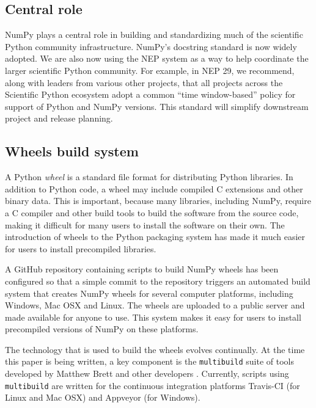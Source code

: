 \subsection*{Central role}

NumPy plays a central role in building and standardizing much of the scientific
Python community infrastructure.
NumPy's docstring standard is now widely adopted.
We are also now using the NEP system as a way to help coordinate the larger
scientific Python community.
For example, in NEP 29, we recommend, along with leaders from various other
projects, that all projects across the Scientific Python ecosystem adopt a
common ``time window-based'' policy for support of Python and NumPy versions.
This standard will simplify downstream project and release planning.

\subsection*{Wheels build system}

A Python \emph{wheel} \cite{PEP427} is a standard file format for
distributing Python libraries.  In addition to Python code, a
wheel may include compiled C extensions and other binary data.
This is important, because many libraries, including NumPy,
require a C compiler and other build tools to build the software
from the source code, making it difficult for many users to install
the software on their own.  The introduction of wheels to the Python
packaging system has made it much easier for users to install
precompiled libraries.

A GitHub repository containing scripts to build NumPy wheels has
been configured so that a simple commit to the repository triggers
an automated build system that creates NumPy wheels for several
computer platforms, including Windows, Mac OSX and Linux.  The wheels
are uploaded to a public server and made available for anyone to use.
This system makes it easy for users to install precompiled versions
of NumPy on these platforms.

The technology that is used to build the wheels evolves continually.
At the time this paper is being written, a key component is the
\texttt{multibuild} suite of tools developed by Matthew Brett and
other developers \cite{multibuild}.  Currently, scripts using
\texttt{multibuild} are written for the continuous integration
platforms Travis-CI (for Linux and Mac OSX) and Appveyor
(for Windows).

